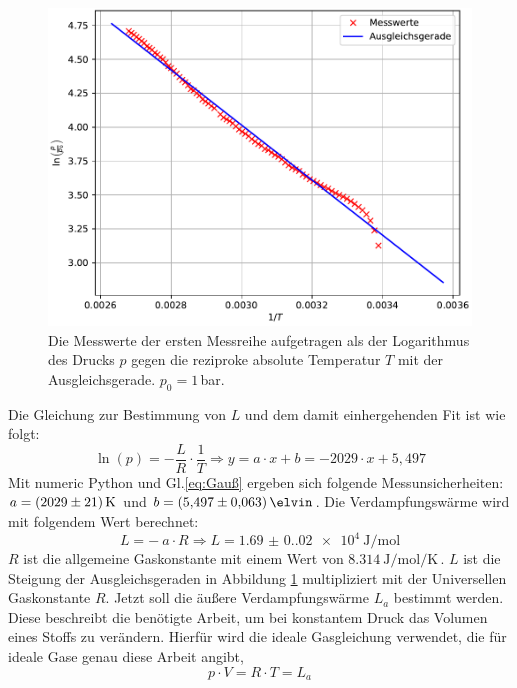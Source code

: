 \begin{figure}[H]
  \centering
  \includegraphics[scale=0.8]{plotc.pdf}
  \caption{Die Messwerte der ersten Messreihe aufgetragen als der Logarithmus des Drucks $p$
  gegen die reziproke absolute Temperatur $T$ mit der Ausgleichsgerade. $p_0=1$\,bar.}
  \label{fig:Ausgleichsgerade}
\end{figure}\noindent
Die Gleichung zur Bestimmung von $L$ und dem damit einhergehenden Fit ist wie folgt:
\begin{equation}
  \ln(p) = - \frac{L}{R} \cdot \frac{1}{T}
  \Rightarrow y = a \cdot x + b = -2029 \cdot x + 5,497
\end{equation}
Mit numeric Python und Gl.\eqref{eq:Gauß} ergeben sich folgende Messunsicherheiten: $a = \SI{2029 +- 21}{\kelvin}$
und $b = \SI{5.497 \pm 0.063}{\elvin}$.
Die Verdampfungswärme wird mit folgendem Wert berechnet:
\begin{equation*}
  L = - \ a \cdot R \Rightarrow L = \SI{1.69(0.02)e4}{\joule\per\mol}
\end{equation*}
$R$ ist die allgemeine Gaskonstante mit einem Wert von $\SI{8.314}{\joule\per\mole\per\kelvin}$\,\cite{Gaskonstante}.
$L$ ist die Steigung der Ausgleichsgeraden in Abbildung \ref{fig:Ausgleichsgerade} multipliziert mit der Universellen Gaskonstante $R$.
\noindent
Jetzt soll die äußere Verdampfungswärme $L_a$ bestimmt werden.
Diese beschreibt die benötigte Arbeit, um bei konstantem Druck das Volumen eines Stoffs zu verändern.
Hierfür wird die ideale Gasgleichung verwendet, die für ideale Gase genau diese Arbeit angibt,
\begin{equation}
    p \cdot V = R \cdot T = L_a
\end{equation}
